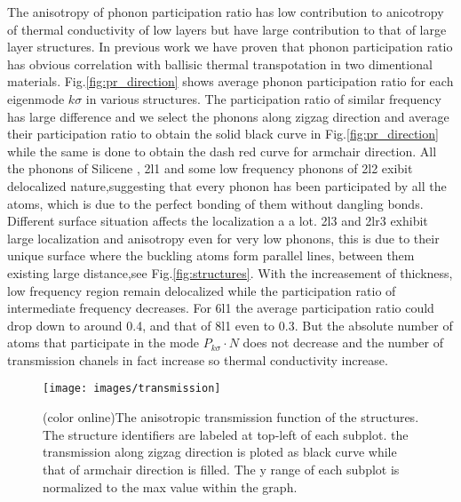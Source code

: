 \documentclass[%
 reprint,
 amsmath,amssymb,
 aps,
 prb,
]{revtex4-1}
\begin{document}
The anisotropy of phonon participation ratio has low contribution to anicotropy of thermal conductivity of low layers but have large contribution to that of large layer structures. In previous work we have proven that phonon participation ratio has obvious correlation with ballisic thermal transpotation in two dimentional materials\cite{Zhou2016}. Fig.\ref{fig:pr_direction} shows average phonon participation ratio for each eigenmode $k\sigma$ in various structures. The participation ratio of similar frequency has large difference and we select the phonons along zigzag direction and  average their participation ratio to obtain the solid black curve in Fig.\ref{fig:pr_direction} while the same is done to obtain the dash red curve for armchair direction. All the phonons of Silicene , 2l1 and some low frequency phonons of 2l2 exibit delocalized nature,suggesting that every phonon has been participated by all the atoms, which is due to the perfect bonding of them without dangling bonds. Different surface situation affects the localization a a lot. 2l3 and 2lr3 exhibit large localization and anisotropy even for very low phonons, this is due to their unique surface where the buckling atoms form parallel lines, between them existing large distance,see Fig.\ref{fig:structures}. With the increasement of thickness, low frequency region remain delocalized while the participation ratio of intermediate frequency  decreases. For 6l1 the average participation ratio could drop down to around 0.4, and that of 8l1 even to 0.3. But the absolute number of atoms that participate in the mode $P_{k\sigma} \cdot N$ does not decrease and the number of transmission chanels in fact increase so thermal conductivity increase.

\begin{figure}[b]
  \texttt{[image: images/transmission]}
  \caption{\label{fig:transmission} (color online)The anisotropic transmission function of the structures. The structure identifiers are labeled at top-left of each subplot. the transmission along zigzag direction is ploted as black curve while that of armchair direction is filled. The y range of each subplot is normalized to the max value within the graph.}
\end{figure}
\end{document}
